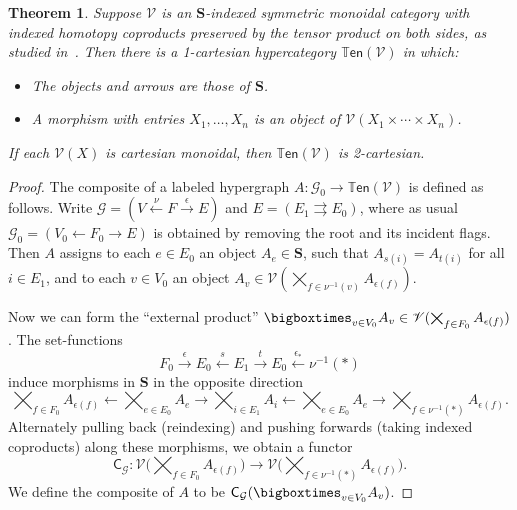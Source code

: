 \documentclass{article}
\newtheorem{thm}{Theorem}[section]
\theoremstyle{definition}
\theoremstyle{remark}
\def\G{\mathcal{G}}
\def\V{\mathscr{V}}
\def\ten{\mathbb{T}\mathsf{en}}
\let\ot\leftarrow
\let\xto\xrightarrow
\let\xot\xleftarrow
\def\bS{\ensuremath{\mathbf{S}}\xspace}
\begin{document}
\begin{thm}\label{thm:ten}
  Suppose $\V$ is an \bS-indexed symmetric monoidal category with indexed homotopy coproducts preserved by the tensor product on both sides, as studied in~\cite{shulman:frbi,ps:indexed}.
  Then there is a 1-cartesian hypercategory $\ten(\V)$ in which:
  \begin{itemize}
  \item The objects and arrows are those of \bS.
  \item A morphism with entries $X_1,\dots,X_n$ is an object of $\V(X_1\times\cdots\times X_n)$.
  \end{itemize}
  If each $\V(X)$ is cartesian monoidal, then $\ten(\V)$ is 2-cartesian.
\end{thm}
\begin{proof}
  The composite of a labeled hypergraph $A:\G_0\to\ten(\V)$ is defined as follows.
  Write $\G= (V\xot{\nu} F\xto{\epsilon} E)$ and $E = (E_1 \rightrightarrows E_0)$, where as usual $\G_0 = (V_0 \ot F_0 \to E)$ is obtained by removing the root and its incident flags.
  Then $A$ assigns to each $e\in E_0$ an object $A_e\in \bS$, such that $A_{s(i)}=A_{t(i)}$ for all $i\in E_1$, and to each $v\in V_0$ an object $A_v \in \V(\bigtimes_{f\in \nu^{-1}(v)} A_{\epsilon(f)})$.

  Now we can form the ``external product'' $\bigboxtimes_{v\in V_0} A_v \in \V(\bigtimes_{f\in F_0} A_{\epsilon(f)})$.
  The set-functions
  \[ F_0 \xto{\epsilon} E_0 \xot{s} E_1 \xto{t} E_0 \xot{\epsilon_\ast} \nu^{-1}(\ast) \]
  induce morphisms in \bS in the opposite direction
  \[ \bigtimes_{f\in F_0} A_{\epsilon(f)} \ot \bigtimes_{e\in E_0} A_e \to \bigtimes_{i\in E_1} A_{i} \ot \bigtimes_{e\in E_0} A_e \to \bigtimes_{f\in \nu^{-1}(\ast)} A_{\epsilon(f)}. \]
  Alternately pulling back (reindexing) and pushing forwards (taking indexed coproducts) along these morphisms, we obtain a functor
  \[ \mathsf{C}_\G : \V\Big(\bigtimes_{f\in F_0} A_{\epsilon(f)}\Big) \to \V\Big(\bigtimes_{f\in \nu^{-1}(\ast)} A_{\epsilon(f)}\Big). \]
  We define the composite of $A$ to be $\mathsf{C}_\G(\bigboxtimes_{v\in V_0} A_v)$.


\end{proof}
\end{document}
